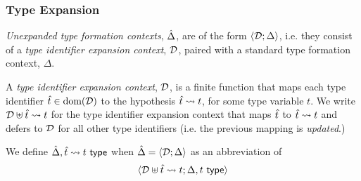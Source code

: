 \subsubsection{Type Expansion}
\emph{Unexpanded type formation contexts}, $\hat{\Delta}$, are of the form $\langle \mathcal{D}; \Delta \rangle$, i.e. they consist of a \emph{type identifier expansion context}, $\mathcal{D}$, paired with a standard type formation context, $\Delta$. 

A \emph{type identifier expansion context}, $\mathcal{D}$, is a finite function that maps each type identifier ${\hat{t}} \in \text{dom}(\mathcal{D})$ to the hypothesis ${\hat{t}} \leadsto t$, for some type variable $t$. We write $\mathcal{D} \uplus {\hat{t}} \leadsto t$ for the type identifier expansion context that maps ${\hat{t}}$ to ${\hat{t}} \leadsto t$ and defers to $\mathcal{D}$ for all other type identifiers (i.e. the previous mapping is \emph{updated}.) 

We define $\hat{\Delta}, {\hat{t}} \leadsto t~\mathsf{type}$ when $\hat{\Delta}=\langle \mathcal{D}; \Delta \rangle$ as an abbreviation of  \[\langle \mathcal{D} \uplus {\hat{t}} \leadsto t; \Delta, t~\mathsf{type} \rangle\]%

